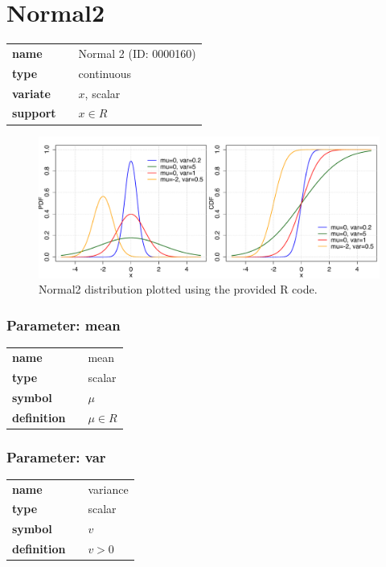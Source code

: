 \section*{Normal2} 

  \bigskip 

\begin{tabular}{p{2cm}cl}
\textbf{name} & & Normal 2 (ID: 0000160)\\ 
 
\textbf{type} & & continuous \\ 

\textbf{variate} & & $x$, scalar \\ 

\textbf{support} & & $x \in R$
\end{tabular}

\begin{figure}[ht!]
\centering
  \includegraphics[width=140mm]{pics/Normal2.pdf}
 \caption{Normal2 distribution plotted using the provided R code.}
 \label{fig:Normal2}
\end{figure}

\subsubsection*{Parameter: mean}

\noindent\begin{tabular}{p{2cm}cl}
\textbf{name} & & mean \\
\textbf{type} & & scalar \\
\textbf{symbol} & & $\mu$  \\
\textbf{definition} & & $\mu \in R$
\end{tabular}
\subsubsection*{Parameter: var}

\noindent\begin{tabular}{p{2cm}cl}
\textbf{name} & & variance \\
\textbf{type} & & scalar \\
\textbf{symbol} & & $v$  \\
\textbf{definition} & & $v>0$
\end{tabular}
